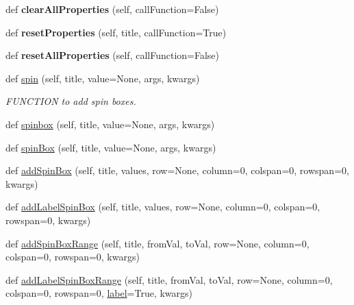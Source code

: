 \begin{DoxyCompactItemize}
\mbox{\label{class_python_01_g_u_i_1_1appjar_1_1gui_a6d115daa532b6a5de84817cb12caa6e2}} 
def {\bfseries clear\+All\+Properties} (self, call\+Function=False)
\item 
\mbox{\label{class_python_01_g_u_i_1_1appjar_1_1gui_a9bebed6fd7dad780cc05388672bc023e}} 
def {\bfseries reset\+Properties} (self, title, call\+Function=True)
\item 
\mbox{\label{class_python_01_g_u_i_1_1appjar_1_1gui_ae0257ca7f73986ce08d8dc8d22e6759f}} 
def {\bfseries reset\+All\+Properties} (self, call\+Function=False)
\item 
def \hyperlink{class_python_01_g_u_i_1_1appjar_1_1gui_a417543438f35a2b478c36a725dcb0db4}{spin} (self, title, value=None, args, kwargs)
\begin{DoxyCompactList}\small\item\em F\+U\+N\+C\+T\+I\+ON to add spin boxes. \end{DoxyCompactList}\item 
def \hyperlink{class_python_01_g_u_i_1_1appjar_1_1gui_ac0269492710efa645bd3006f9b11db50}{spinbox} (self, title, value=None, args, kwargs)
\item 
def \hyperlink{class_python_01_g_u_i_1_1appjar_1_1gui_aecb4e448fb4eeb8ee81e21e702ce7a24}{spin\+Box} (self, title, value=None, args, kwargs)
\item 
def \hyperlink{class_python_01_g_u_i_1_1appjar_1_1gui_adcb21f0373bac433c28be4f4e31a2f09}{add\+Spin\+Box} (self, title, values, row=None, column=0, colspan=0, rowspan=0, kwargs)
\item 
def \hyperlink{class_python_01_g_u_i_1_1appjar_1_1gui_a9da6074d7b4fa3a79ec0f0af88e7a0a0}{add\+Label\+Spin\+Box} (self, title, values, row=None, column=0, colspan=0, rowspan=0, kwargs)
\item 
def \hyperlink{class_python_01_g_u_i_1_1appjar_1_1gui_a1cab65af7f968f7935b0b7505a22f14c}{add\+Spin\+Box\+Range} (self, title, from\+Val, to\+Val, row=None, column=0, colspan=0, rowspan=0, kwargs)
\item 
def \hyperlink{class_python_01_g_u_i_1_1appjar_1_1gui_af5311ecb5bf0981d5abf2a53e40f188d}{add\+Label\+Spin\+Box\+Range} (self, title, from\+Val, to\+Val, row=None, column=0, colspan=0, rowspan=0, \hyperlink{class_python_01_g_u_i_1_1appjar_1_1gui_a899e593dca96dd2a31035558b685e3bd}{label}=True, kwargs)

\end{DoxyCompactItemize}
